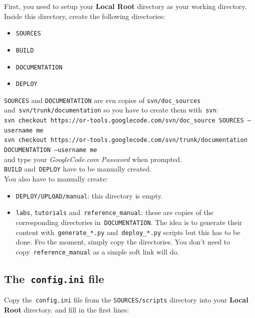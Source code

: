 \documentclass[a4paper,10pt]{article}
\newcommand{\code}[1]{\texttt{#1}}
\begin{document}
First, you need to setup your {\bf Local Root} directory as your working directory. Inside this directory, create the following directories:
\begin{itemize}
\item \code{SOURCES}
\item \code{BUILD}
\item \code{DOCUMENTATION}
\item \code{DEPLOY}
\end{itemize}

\code{SOURCES} and \code{DOCUMENTATION} are svn copies of \code{svn/doc\_sources} and~\code{svn/trunk/documentation} so you have to create them with~\code{svn}:\\

\code{svn checkout https://or-tools.googlecode.com/svn/doc\_source SOURCES --username me}\\

\code{svn checkout https://or-tools.googlecode.com/svn/trunk/documentation DOCUMENTATION --username me}\\

and type your \emph{GoogleCode.com Password} when prompted.\\

\code{BUILD} and~\code{DEPLOY} have to be manually created.\\

You also have to manually create:

\begin{itemize}
\item \code{DEPLOY/UPLOAD/manual}: this directory is empty.
\item \code{labs}, \code{tutorials} and~\code{reference\_manual}: these are copies of the corresponding directories in~\code{DOCUMENTATION}. The idea is to generate their content with~\code{generate\_*.py} and~\code{deploy\_*.py} scripts but this has to be done. Fro the moment, simply copy the directories. You don't need to copy~\code{reference\_manual} as a simple soft link will do.
\end{itemize}

\subsection{The~\code{config.ini} file}

Copy the~\code{config.ini} file from the \code{SOURCES/scripts} directory into your {\bf Local Root} directory. and fill in 
the first lines:
\end{document}
